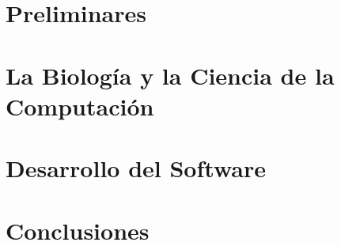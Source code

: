 \documentclass[a4paper,10pt]{report}
\theoremstyle{definition}
\begin{document}






\tableofcontents

\part{Preliminares}


\part{La Biolog\'ia y la Ciencia de la Computaci\'on}




\part{Desarrollo del Software}
\label{software}






\part{Conclusiones}


\cleardoublepage



\appendix

\end{document}
